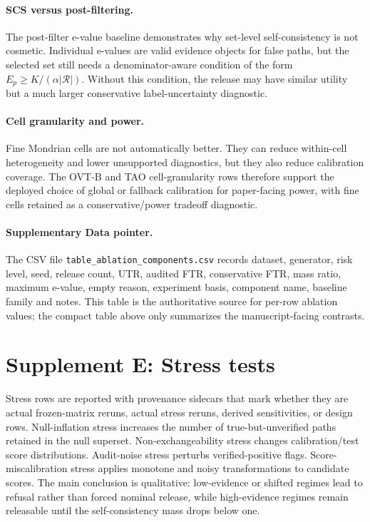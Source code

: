 \documentclass[11pt]{article}
\newcommand{\Rcal}{\mathcal R}
\begin{document}
\paragraph{SCS versus post-filtering.}
The post-filter e-value baseline demonstrates why set-level self-consistency is not cosmetic.
Individual e-values are valid evidence objects for false paths, but the selected set still needs a denominator-aware condition of the form \(E_p\ge K/(\alpha|\Rcal|)\).
Without this condition, the release may have similar utility but a much larger conservative label-uncertainty diagnostic.

\paragraph{Cell granularity and power.}
Fine Mondrian cells are not automatically better.
They can reduce within-cell heterogeneity and lower unsupported diagnostics, but they also reduce calibration coverage.
The OVT-B and TAO cell-granularity rows therefore support the deployed choice of global or fallback calibration for paper-facing power, with fine cells retained as a conservative/power tradeoff diagnostic.

\paragraph{Supplementary Data pointer.}
The CSV file \texttt{table\_ablation\_components.csv} records dataset, generator, risk level, seed, release count, UTR, audited FTR, conservative FTR, mass ratio, maximum e-value, empty reason, experiment basis, component name, baseline family and notes.
This table is the authoritative source for per-row ablation values; the compact table above only summarizes the manuscript-facing contrasts.

\clearpage

\section*{Supplement E: Stress tests}

Stress rows are reported with provenance sidecars that mark whether they are actual frozen-matrix reruns, actual stress reruns, derived sensitivities, or design rows.
Null-inflation stress increases the number of true-but-unverified paths retained in the null superset.
Non-exchangeability stress changes calibration/test score distributions.
Audit-noise stress perturbs verified-positive flags.
Score-miscalibration stress applies monotone and noisy transformations to candidate scores.
The main conclusion is qualitative: low-evidence or shifted regimes lead to refusal rather than forced nominal release, while high-evidence regimes remain releasable until the self-consistency mass drops below one.
\end{document}
